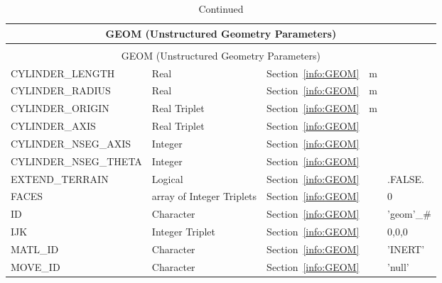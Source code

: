\documentclass[12pt]{article}
\begin{document}
\begin{longtable}{@{\extracolsep{\fill}}|l|l|l|l|l|}
\caption[Unstructured geometry parameters ({\ct GEOM} namelist group)]{For more information see Section~\ref{info:GEOM}.}
\label{tbl:GEOM} \\
\hline
\multicolumn{5}{|c|}{{\ct GEOM} (Unstructured Geometry Parameters)} \\
\hline \hline
\endfirsthead
\caption[]{Continued} \\
\hline
\multicolumn{5}{|c|}{{\ct GEOM} (Unstructured Geometry Parameters)} \\
\hline \hline
\endhead
{\ct CYLINDER\_LENGTH}& Real                  & Section~\ref{info:GEOM}            &   m       &                      \\ \hline
{\ct CYLINDER\_RADIUS}& Real                  & Section~\ref{info:GEOM}            &   m       &                       \\ \hline
{\ct CYLINDER\_ORIGIN}& Real Triplet          & Section~\ref{info:GEOM}            &   m       &             \\ \hline
{\ct CYLINDER\_AXIS}& Real Triplet          & Section~\ref{info:GEOM}            &          &             \\ \hline
{\ct CYLINDER\_NSEG\_AXIS}& Integer          & Section~\ref{info:GEOM}            &          &             \\ \hline
{\ct CYLINDER\_NSEG\_THETA}& Integer          & Section~\ref{info:GEOM}            &          &             \\ \hline
{\ct EXTEND\_TERRAIN}& Logical          & Section~\ref{info:GEOM}            &          &    {\ct .FALSE.}         \\ \hline
{\ct FACES}        & array of Integer Triplets     & Section~\ref{info:GEOM}     &           &    0                     \\ \hline
{\ct ID}           & Character              & Section~\ref{info:GEOM}            &           &   {\ct 'geom'\_\#}           \\ \hline
{\ct IJK}          & Integer Triplet        & Section~\ref{info:GEOM}            &           &   0,0,0                  \\ \hline
{\ct MATL\_ID}     & Character              & Section~\ref{info:GEOM}            &           &  {\ct 'INERT'}           \\ \hline
{\ct MOVE\_ID}     & Character              & Section~\ref{info:GEOM}            &           &  {\ct 'null'}           \\ \hline

\end{longtable}
\end{document}
